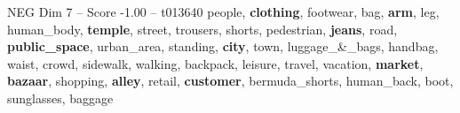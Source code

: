 \begin{textsample}{NEG Dim 7 – Score -1.00 – t013640}  \label{ex:f7_neg_014}
people, \textbf{clothing}, footwear, bag, \textbf{arm}, leg, human\_body, \textbf{temple}, street, trousers, shorts, pedestrian, \textbf{jeans}, road, \textbf{public\_space}, urban\_area, standing, \textbf{city}, town, luggage\_\&\_bags, handbag, waist, crowd, sidewalk, walking, backpack, leisure, travel, vacation, \textbf{market}, \textbf{bazaar}, shopping, \textbf{alley}, retail, \textbf{customer}, bermuda\_shorts, human\_back, boot, sunglasses, baggage

\end{textsample}
